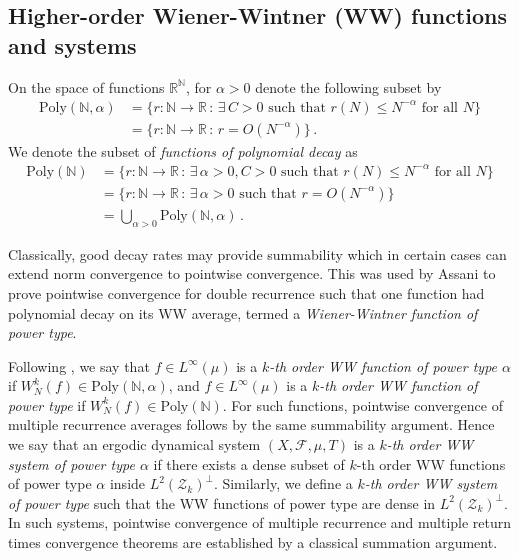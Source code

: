 \documentclass[11pt, oneside]{amsart}   	%
\newcommand{\R}{\mathbb{R}}
\newcommand{\1}{\mathbbm{1}}
\newcommand{\N}{\mathbb{N}}
\theoremstyle{definition}
\begin{document}
\subsection{Higher-order Wiener-Wintner (WW) functions and systems}\label{S:Systems}

On the space of functions $\R^\N$, for $\alpha > 0$ denote the following subset by
\begin{align*}
\text{Poly}(\N, \alpha) &= \{r:\N \to \R \, :\, \exists \, C>0 \text{ such that }r(N) \leq N^{-\alpha} \text{ for all }N\} \\
&= \{r:\N \to \R \, :\, r = O(N^{-\alpha}) \} \, .
\end{align*}
We denote the subset of \textit{functions of polynomial decay} as
\begin{align*}
\text{Poly}(\N) &= \{r:\N \to \R \, :\, \exists \,\alpha > 0, C>0 \text{ such that }r(N) \leq N^{-\alpha} \text{ for all }N\} \\
&= \{r:\N \to \R \, :\, \exists \,\alpha > 0\text{ such that }r = O(N^{-\alpha}) \} \\
&= \bigcup_{\alpha > 0} \text{Poly}(\N, \alpha) \, .
\end{align*}

Classically, good decay rates may provide summability which in certain cases can extend norm convergence to pointwise convergence. This was used by Assani \cite{assani} to prove pointwise convergence for double recurrence such that one function had polynomial decay on its WW average, termed a \textit{Wiener-Wintner function of power type}.

Following \cite{assani2024higherorderwienerwintnersystems}, we say that $f\in L^\infty(\mu)$ is a \textit{$k$-th order WW function of power type $\alpha$} if $W_N^k(f) \in \text{Poly} (\N, \alpha)$, and $f\in L^\infty(\mu)$ is a \textit{$k$-th order WW function of power type} if $W_N^k(f) \in \text{Poly}(\N)$. For such functions, pointwise convergence of multiple recurrence averages follows by the same summability argument. Hence we say that an ergodic dynamical system $(X, \mathcal{F}, \mu, T)$ is a \textit{$k$-th order WW system of power type $\alpha$} if there exists a dense subset of $k$-th order WW functions of power type $\alpha$ inside $L^2(\mathcal{Z}_k)^\perp$. Similarly, we define a \textit{$k$-th order WW system of power type} such that the WW functions of power type are dense in $L^2(\mathcal{Z}_k)^\perp$. In such systems, pointwise convergence of multiple recurrence and multiple return times convergence theorems are established by a classical summation argument.
\end{document}
